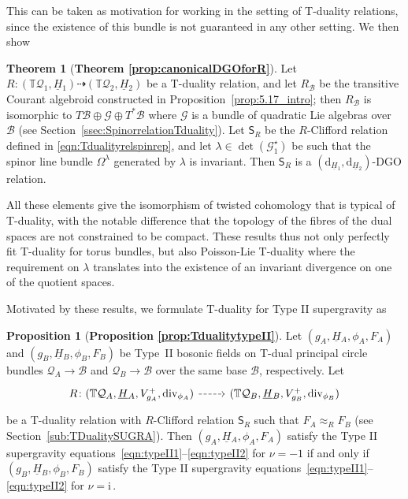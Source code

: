 \documentclass[a4paper, reqno, 11pt]{amsart}
\numberwithin{equation}{section}
\theoremstyle{definition}
\newtheorem{proposition}[equation]{Proposition}
\newtheorem{theorem}[equation]{Theorem}
\newcommand{\red}[1]{\underline{#1}}
\newcommand{\de}{\mathrm{d}}
\newcommand{\ii}{\mathrm{i}}
\newcommand{\IT}{\mathbb{T}}
\newcommand{\cB}{{\mathcal B}}
\newcommand{\cQ}{{\mathcal Q}}
\newcommand{\ccG}{{\mathscr G}}
\newcommand{\sfS}{{\mathsf{S}}}
\newcommand{\rel}{\dashrightarrow}
\renewcommand{\div}{{\rm div}}
\theoremstyle{remark}
\begin{document}
This can be taken as motivation for working in the setting of T-duality relations, since the existence of this bundle is not guaranteed in any other setting.
We then show

\begin{theorem}[\textbf{Theorem \ref{prop:canonicalDGOforR}}]
    Let $R\colon (\IT \cQ_1, \red H{}_1) \rel (\IT \cQ_2, \red H{}_2)$ be a T-duality relation, and let $R_\cB$ be the transitive Courant algebroid constructed in Proposition~\ref{prop:5.17_intro}; then $R_\cB$ is isomorphic to $T\cB \oplus \ccG \oplus T^*\cB$ where $\ccG$ is a bundle of quadratic Lie algebras over $\cB$ (see Section~\ref{ssec:SpinorrelationTduality}). Let $\sfS_R$ be the $R$-Clifford relation defined in \eqref{eqn:Tdualityrelspinrep}, and let $\lambda\in \det(\ccG^\star_1)$ be such that the spinor line bundle $\Omega^\lambda$ generated by $\lambda$ is invariant. Then $\sfS_R$ is a $(\de_{\red H{}_1}, \de_{\red H{}_2})$-DGO relation.
\end{theorem}

All these elements give the isomorphism of twisted cohomology that is typical of T-duality, with the notable difference that the topology of the fibres of the dual spaces are not constrained to be compact. These results thus not only perfectly fit  T-duality for torus bundles, but also Poisson-Lie T-duality where the requirement on $\lambda$ translates into the existence of an invariant divergence on one of the quotient spaces.

Motivated by these results, we formulate T-duality for Type II supergravity as

\begin{proposition}[\textbf{Proposition \ref{prop:TdualitytypeII}}]
     Let $(g_A,\red H{}_A,\phi_A, F_A)$ and $(g_B, \red H{}_B, \phi_B, F_B)$ be Type~II bosonic fields on T-dual principal circle bundles $\cQ_A \to \cB$ and $\cQ_B\to\cB$ over the same base $\cB$, respectively. Let
    \begin{equation}
    \begin{tikzcd}
        R \colon (\IT \cQ_A, \red H{}_A, V^+_{g_A}, \div_{\phi_A})\ar[r,dashed] & (\IT \cQ_B, \red H{}_B, V^+_{g_B}, \div_{\phi_B})
        \end{tikzcd}
    \end{equation}
    be a T-duality relation with $R$-Clifford relation $\sfS_R$ such that $F_A \approx_R F_B$ (see Section~\ref{sub:TDualitySUGRA}).
    Then $(g_A,\red H{}_A,\phi_A, F_A)$ satisfy the Type II supergravity equations~\eqref{eqn:typeII1}--\eqref{eqn:typeII2} for $\nu = -1$ if and only if $(g_B,\red H{}_B,\phi_B, F_B)$ satisfy the Type II supergravity equations~\eqref{eqn:typeII1}--\eqref{eqn:typeII2} for $\nu = \ii\,$.
\end{proposition}
\end{document}
